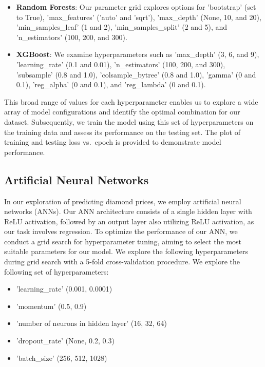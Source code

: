 \documentclass[conference]{IEEEtran}
\begin{document}
\begin{itemize}
    \item \textbf{Random Forests}: Our parameter grid explores options for 'bootstrap' (set to True), 'max\_features' ('auto' and 'sqrt'), 'max\_depth' (None, 10, and 20), 'min\_samples\_leaf' (1 and 2), 'min\_samples\_split' (2 and 5), and 'n\_estimators' (100, 200, and 300).
    \item \textbf{XGBoost}: We examine hyperparameters such as 'max\_depth' (3, 6, and 9), 'learning\_rate' (0.1 and 0.01), 'n\_estimators' (100, 200, and 300), 'subsample' (0.8 and 1.0), 'colsample\_bytree' (0.8 and 1.0), 'gamma' (0 and 0.1), 'reg\_alpha' (0 and 0.1), and 'reg\_lambda' (0 and 0.1).
\end{itemize}

This broad range of values for each hyperparameter enables us to explore a wide array of model configurations and identify the optimal combination for our dataset. Subsequently, we train the model using this set of hyperparameters on the training data and assess its performance on the testing set. The plot of training and testing loss vs.\ epoch is provided to demonstrate model performance.

\subsection{Artificial Neural Networks}

In our exploration of predicting diamond prices, we employ artificial neural networks (ANNs). Our ANN architecture consists of a single hidden layer with ReLU activation, followed by an output layer also utilizing ReLU activation, as our task involves regression. To optimize the performance of our ANN, we conduct a grid search for hyperparameter tuning, aiming to select the most suitable parameters for our model. We explore the following hyperparameters during grid search with a 5-fold cross-validation procedure. We explore the following set of hyperparameters:

\begin{itemize}
    \item 'learning\_rate' (0.001, 0.0001)
    \item 'momentum' (0.5, 0.9)
    \item 'number of neurons in hidden layer' (16, 32, 64)
    \item 'dropout\_rate' (None, 0.2, 0.3)
    \item 'batch\_size' (256, 512, 1028)
\end{itemize}
\end{document}
